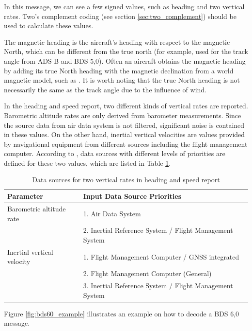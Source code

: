 In this message, we can see a few signed values, such as heading and two vertical rates. Two's complement coding (see section \ref{sec:two_complement}) should be used to calculate these values.

The magnetic heading is the aircraft's heading with respect to the magnetic North, which can be different from the true north (for example, used for the track angle from ADS-B and BDS 5,0). Often an aircraft obtains the magnetic heading by adding its true North heading with the magnetic declination from a world magnetic model, such as \cite{chulliat2015}. It is worth noting that the true North heading is not necessarily the same as the track angle due to the influence of wind.

In the heading and speed report, two different kinds of vertical rates are reported. Barometric altitude rates are only derived from barometer measurements. Since the source data from air data system is not filtered, significant noise is contained in these values. On the other hand, inertial vertical velocities are values provided by navigational equipment from different sources including the flight management computer. According to \cite{icao9688}, data sources with different levels of priorities are defined for these two values, which are listed in Table \ref{tb:vertical_rate_source}.

\begin{table}[ht]
\footnotesize
\centering
\caption{Data sources for two vertical rates in heading and speed report}
\label{tb:vertical_rate_source}
\begin{tabular}{|l|l|}
\hline
\textbf{Parameter} & \textbf{Input Data Source Priorities} \\ \hline
Barometric altitude rate & 1. Air Data System\\ 
& 2. Inertial Reference System / Flight Management System \\ \hline
Inertial vertical velocity & 1. Flight Management Computer / GNSS integrated\\ 
& 2. Flight Management Computer (General)\\
& 3. Inertial Reference System / Flight Management System \\ \hline
\end{tabular}
\end{table}


Figure \ref{fig:bds60_example} illustrates an example on how to decode a BDS 6,0 message.

